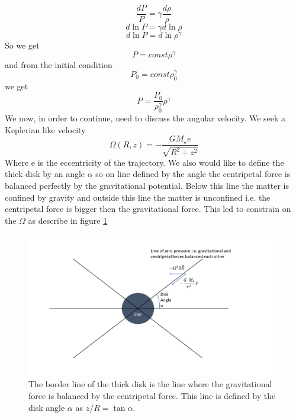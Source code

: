 \documentclass[12pt, a4paper]{article}
\begin{document}
\begin{equation}
    \frac{d P}{P} = \gamma \frac{d\rho}{\rho}
\end{equation}
\begin{equation}
    d \ln{P} = \gamma d \ln\rho
\end{equation}
\begin{equation}
    d \ln{P} = d \ln\rho^\gamma
\end{equation}
So we get
\begin{equation}
    P=const \rho^\gamma
\end{equation}
and from the initial condition 
\begin{equation}
    P_0=const \rho_0^\gamma
\end{equation}
we get
\begin{equation}
    P=\frac{P_0}{\rho_0^\gamma} \rho^\gamma
\end{equation}
We now, in order to continue, need to discuss the angular velocity.
We seek a Keplerian like velocity 
\begin{equation}
    \Omega(R,z) = - \frac{G M_\star e}{\sqrt{R^2+z^2}}
\end{equation}
Where e is the eccentricity of the trajectory.
We also would like to define the thick disk by an angle $\alpha$ so on line defined by the angle the centripetal force is balanced perfectly by the gravitational potential.
Below this line the matter is confined by gravity and outside this line the matter is unconfined i.e. the centripetal force is bigger then the gravitational force.
This led to constrain on the $\Omega$ as describe in figure \ref{fig:centripect-force}   
\begin{figure}[ht!]
    \begin{center}
        \includegraphics[width=1.0\textwidth]{centripect-force.png}
    \end{center}
    \caption{
        The border line of the thick disk is the line where the gravitational force is balanced by the centripetal force. This line is defined by the disk angle $\alpha$ as $z/R=\tan\alpha$.
    }\label{fig:centripect-force}
\end{figure}
\end{document}
